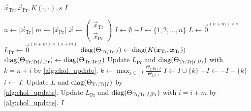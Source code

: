 \begin{algorithmic}[1]
  \REQUIRE \( \vec{x}_\text{Tr}, \vec{x}_\text{Pr}, K(\cdot, \cdot), s \)
  \ENSURE \( I \)

  \STATE \( n \gets \lvert \vec{x}_\text{Tr} \rvert \)
  \STATE \( m \gets \lvert \vec{x}_\text{Pr} \rvert \)
  \STATE \(
    \vec{x} \gets
    \begin{pmatrix}
      \vec{x}_\text{Tr} \\
      \vec{x}_\text{Pr}
    \end{pmatrix}
  \)
  \STATE \( I \gets \emptyset \)
  \STATE \( -I \gets \{ 1, 2, \dotsc, n \} \)
  \STATE \( L \gets \vec{0}^{(n + m) \times s} \)
  \STATE \( L_\text{Pr} \gets \vec{0}^{(n + m) \times (s + m)} \)
  \STATE \(
    \operatorname{diag}(\Theta_{\text{Tr}, \text{Tr} \mid I}) \gets
    \operatorname{diag}(K(\bm{x}_\text{Tr}, \bm{x}_\text{Tr}))
  \)
  \STATE \(
    \operatorname{diag}(\Theta_{\text{Tr}, \text{Tr} \mid I, \text{Pr}}) \gets
    \operatorname{diag}(\Theta_{\text{Tr}, \text{Tr} \mid I})
  \)
    \STATE Update \( L_\text{Pr} \) and \( \operatorname{diag}(\Theta_{\text{Tr}, \text{Tr}
      \mid I, \text{Pr}}) \) with \( k = n + i \) by \cref{alg:chol_update}.
  \ENDFOR
    \STATE \(
      k \gets \max_{j \in -I}
      \frac{\Theta_{j, \text{Pr} \mid I}}{\Theta_{jj \mid I}}
    \)
    \STATE \( I \gets I \cup \{ k \} \)
    \STATE \( -I \gets -I - \{ k \} \)
    \STATE \( i \gets \lvert I \rvert \)
    \STATE Update \( L \) and \( \operatorname{diag}(\Theta_{\text{Tr}, \text{Tr}
      \mid I}) \) by \\ \cref{alg:chol_update}.
    \STATE Update \( L_\text{Pr} \) and \( \operatorname{diag}(\Theta_{\text{Tr}, \text{Tr}
      \mid I, \text{Pr}}) \) with \( i = i + m \) by \cref{alg:chol_update}.
  \ENDWHILE
  \RETURN \( I \)
\end{algorithmic}
